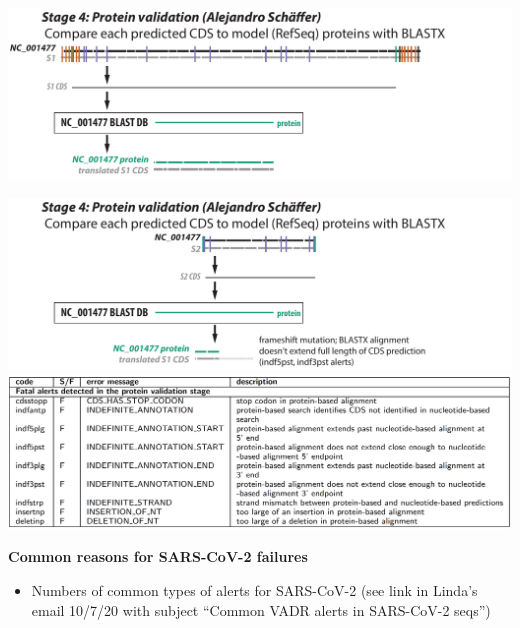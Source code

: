 \documentclass[landscape]{slides}
\begin{document}
\begin{slide}
\begin{center}

\includegraphics[width=10.5in]{figs/v-annotate-stage4-1}

\end{center}
\vfill
\end{slide}
\begin{slide}
\begin{center}

\includegraphics[width=10.5in]{figs/v-annotate-stage4-2}
\includegraphics[width=10.5in]{figs/ss-protein-alert-list}

\end{center}
\vfill
\end{slide}
\begin{slide}
\begin{center}
\Large{\textbf{Common reasons for SARS-CoV-2 failures}}
\end{center}

\begin{itemize}
\item Numbers of common types of alerts for SARS-CoV-2
  (see link in Linda's email 10/7/20 with subject ``Common VADR alerts
  in SARS-CoV-2 seqs'')
\end{itemize}

\vfill
\end{slide}
\end{document}
